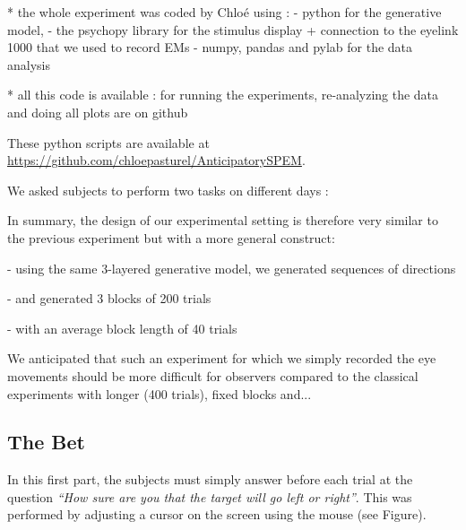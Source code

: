 \documentclass[12pt,english]{article}%
\begin{document}
 * the whole experiment was coded by Chloé using :
 - python for the generative model,
 - the psychopy library for the stimulus display + connection to the eyelink 1000 that we used to record EMs
 - numpy, pandas and pylab for the data analysis

  * all this code is available : for running the experiments, re-analyzing the data and doing all plots are on github

These python scripts are available at \url{https://github.com/chloepasturel/AnticipatorySPEM}.


We asked subjects to perform two tasks on different days :

In summary, the design of our experimental setting is therefore very similar to the previous experiment but with a more general construct:

- using the same 3-layered generative model, we generated sequences of directions

- and generated 3 blocks of 200 trials

- with an average block length of 40 trials

We anticipated that such an  experiment for which we simply recorded the eye movements should be more difficult for observers compared to the classical experiments with longer (400 trials), fixed blocks and...

\subsection{The Bet}
In this first part, the subjects must simply answer before each trial at the question \textit{ ``How sure are you that the target will go left or right''}. This was performed by adjusting a cursor on the screen using the mouse (see Figure).

\end{document}
